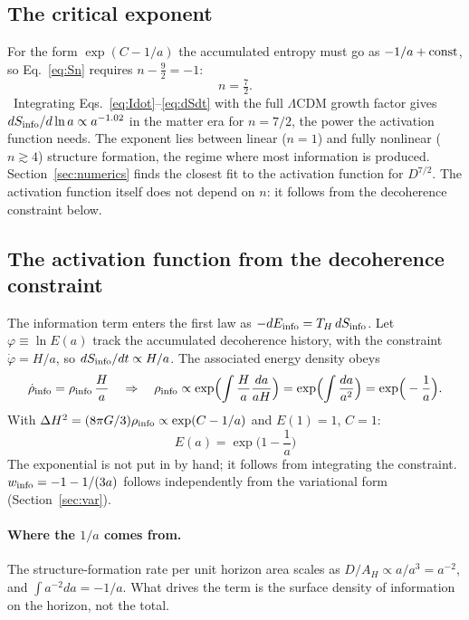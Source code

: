 \subsection{The critical exponent}
For the form $\exp(C-1/a)$ the accumulated entropy must go as $-1/a+{\rm const}$, so Eq.~\eqref{eq:Sn} requires $n-\tfrac92=-1$:
\begin{equation}n=\tfrac72 .\end{equation}
\calc\ Integrating Eqs.~\eqref{eq:Idot}--\eqref{eq:dSdt} with the full $\Lambda$CDM growth factor gives $dS_{\rm info}/d\ln a\propto a^{-1.02}$ in the matter era for
$n=7/2$, the power the activation function needs. The exponent lies between linear ($n=1$) and fully nonlinear ($n\gtrsim4$) structure formation, the
regime where most information is produced. Section~\ref{sec:numerics} finds the closest fit to the activation function for $D^{7/2}$. The activation function itself does not depend on $n$: it follows from the decoherence
constraint below.

\subsection{The activation function from the decoherence constraint}
The information term enters the first law as $-dE_{\rm info}=T_H\,dS_{\rm info}$. Let $\varphi\equiv\ln E(a)$ track the accumulated decoherence history,
with the constraint $\dot\varphi=H/a$, so $dS_{\rm info}/dt\propto H/a$. The associated energy density obeys
\begin{equation}\dot\rho_{\rm info}=\rho_{\rm info}\,\frac{H}{a}\quad\Rightarrow\quad
\rho_{\rm info}\propto\exp\!\Big(\!\int\frac{H}{a}\frac{da}{aH}\Big)=\exp\!\Big(\!\int\frac{da}{a^2}\Big)=\exp\!\Big(-\frac1a\Big).\end{equation}
With $\Delta H^2=(8\pi G/3)\rho_{\rm info}\propto\exp(C-1/a)$ and $E(1)=1$, $C=1$:
\begin{equation}\boxed{E(a)=\exp\!\Big(1-\frac1a\Big)}\label{eq:Ea}\end{equation}
The exponential is not put in by hand; it follows from integrating the constraint. $w_{\rm info}=-1-1/(3a)$ follows independently from the variational
form (Section~\ref{sec:var}).

\paragraph{Where the $1/a$ comes from.} The structure-formation rate per unit horizon area scales as $D/A_H\propto a/a^3=a^{-2}$, and $\int a^{-2}da=-1/a$.
What drives the term is the surface density of information on the horizon, not the total.

